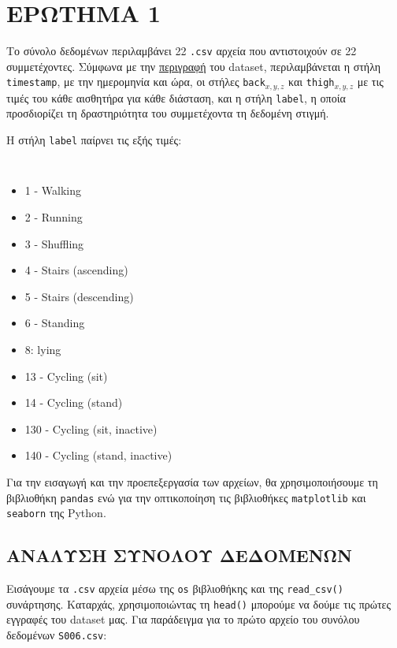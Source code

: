 \chapter{ΕΡΩΤΗΜΑ 1}
    Το σύνολο δεδομένων περιλαμβάνει 22 \texttt{.csv} αρχεία που αντιστοιχούν σε 22 συμμετέχοντες. Σύμφωνα με την \href{https://archive.ics.uci.edu/dataset/779/harth}{περιγραφή} του dataset,
    περιλαμβάνεται η στήλη \texttt{timestamp}, με την ημερομηνία και ώρα, οι στήλες \texttt{back}\(_{x,y,z}\) και \texttt{thigh}\(_{x,y,z}\)
    με τις τιμές του κάθε αισθητήρα για κάθε διάσταση, και η στήλη \texttt{label}, η οποία προσδιορίζει τη δραστηριότητα του συμμετέχοντα τη δεδομένη στιγμή.

    Η στήλη \texttt{label} παίρνει τις εξής τιμές:

    \vspace{-10pt}
    \begin{multicols}{2} \centering \tt
        \begin{itemize}[label={}]
            \addtolength\itemsep{-4mm}
            \item 1 - Walking
            \item 2 - Running
            \item 3 - Shuffling
            \item 4 - Stairs (ascending)
            \item 5 - Stairs (descending)
            \item 6 - Standing
            \item 8: lying
            \item 13 - Cycling (sit)
            \item 14 - Cycling (stand)
            \item 130 - Cycling (sit, inactive)
            \item 140 - Cycling (stand, inactive)
        \end{itemize}
    \end{multicols}
    \vspace{-10pt}

    Για την εισαγωγή και την προεπεξεργασία των αρχείων, θα χρησιμοποιήσουμε τη βιβλιοθήκη \texttt{pandas}
    ενώ για την οπτικοποίηση τις βιβλιοθήκες \texttt{matplotlib} και \texttt{seaborn} της Python.

    \section{ΑΝΑΛΥΣΗ ΣΥΝΟΛΟΥ ΔΕΔΟΜΕΝΩΝ}
        Εισάγουμε τα \texttt{.csv} αρχεία μέσω της \texttt{os} βιβλιοθήκης και της \texttt{read\_csv()} συνάρτησης.
        Καταρχάς, χρησιμοποιώντας τη \texttt{head()} μπορούμε να δούμε τις πρώτες εγγραφές του dataset μας.
        Για παράδειγμα για το πρώτο αρχείο του συνόλου δεδομένων \texttt{S006.csv}:

